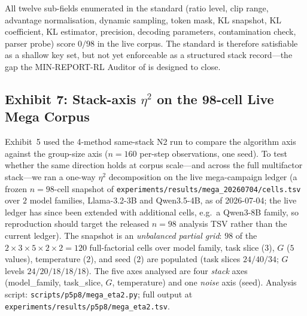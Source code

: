 All twelve sub-fields enumerated in the standard (ratio level, clip range,
advantage normalisation, dynamic sampling, token mask, KL snapshot, KL
coefficient, KL estimator, precision, decoding parameters, contamination
check, parser probe) score $0/98$ in the live corpus. The standard is
therefore satisfiable as a shallow key set, but not yet enforceable as a
structured stack record---the gap the MIN-REPORT-RL Auditor of
 is designed to close.

\subsection{Exhibit 7: Stack-axis $\eta^{2}$ on the 98-cell Live Mega Corpus}
\label{sec:p5-exhibit-mega-eta2}
Exhibit~5 used the 4-method same-stack N2 run to compare the algorithm axis
against the group-size axis ($n=160$ per-step observations, one seed). To test
whether the same direction holds at corpus scale---and across the full
multifactor stack---we ran a one-way $\eta^{2}$ decomposition on the live
mega-campaign ledger (a frozen $n=98$-cell snapshot of
\texttt{experiments/results/mega\_20260704/cells.tsv} over $2$ model families,
Llama-3.2-3B and Qwen3.5-4B, as of 2026-07-04; the live ledger has since been
extended with additional cells, e.g.\ a Qwen3-8B family, so reproduction should
target the released $n=98$ analysis TSV rather than the current ledger).
The snapshot is an \emph{unbalanced partial grid}: $98$ of the
$2 \times 3 \times 5 \times 2 \times 2 = 120$ full-factorial cells over model
family, task slice ($3$), $G$ ($5$ values), temperature ($2$), and seed ($2$)
are populated (task slices $24/40/34$; $G$ levels $24/20/18/18/18$). The five axes analysed are
four \emph{stack} axes (model\_family, task\_slice, $G$, temperature) and one
\emph{noise} axis (seed). Analysis script:
\texttt{scripts/p5p8/mega\_eta2.py}; full output at
\texttt{experiments/results/p5p8/mega\_eta2.tsv}.

